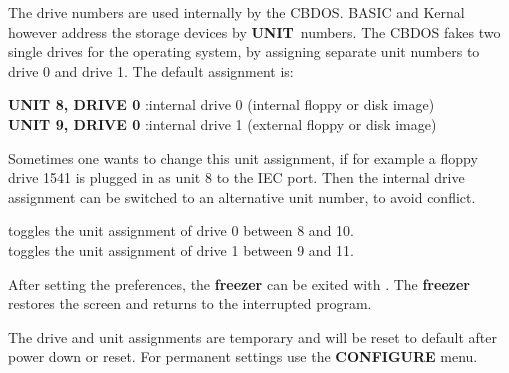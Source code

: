 The drive numbers are used internally by the CBDOS. BASIC and Kernal
however address the storage devices by {\bf UNIT} numbers.
The CBDOS fakes two single drives for the
operating system, by assigning separate unit numbers to drive 0 and drive 1.
The default assignment is:

{\bf UNIT 8, DRIVE 0} :internal drive 0 (internal floppy or disk image) \\
{\bf UNIT 9, DRIVE 0} :internal drive 1 (external floppy or disk image)

Sometimes one wants to change this unit assignment, if for example
a floppy drive 1541 is plugged in as unit 8 to the IEC port.
Then the internal drive assignment can be switched to an alternative unit
number, to avoid conflict.

 toggles the unit assignment of drive 0 between 8 and 10. \\
 toggles the unit assignment of drive 1 between 9 and 11.

After setting the preferences, the {\bf freezer} can be exited
with . The {\bf freezer} restores the screen and
returns to the interrupted program.

The drive and unit assignments are temporary and will be reset to default
after power down or reset. For permanent settings use the {\bf CONFIGURE}
menu.

